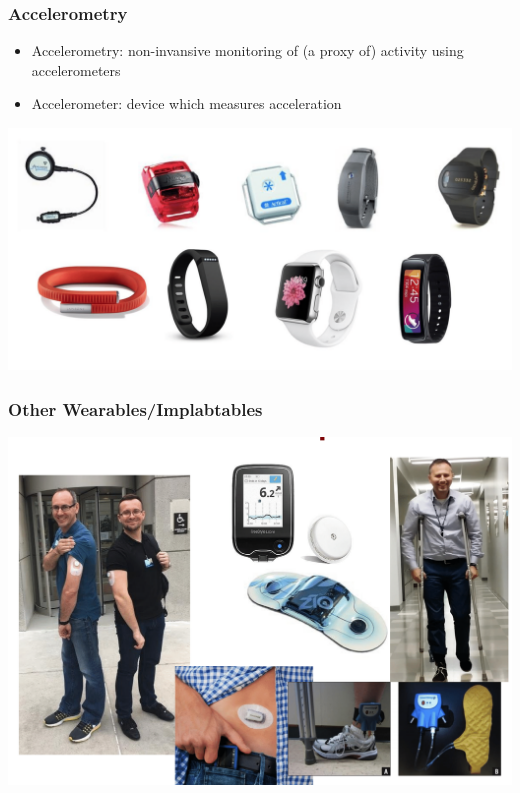 \documentclass[10pt]{beamer}\usepackage[]{graphicx}\usepackage[]{color}
\begin{document}
\begin{frame}
\frametitle{Accelerometry}
\begin{itemize}
\item Accelerometry: non-invansive monitoring of (a proxy of) activity using accelerometers
\item Accelerometer: device which measures acceleration
\end{itemize}
\includegraphics[width=\textwidth]{accelerometers_example}
\end{frame}




\begin{frame}
\frametitle{Other Wearables/Implabtables}
\includegraphics[width=\textwidth]{wearables_example}
\end{frame}
\end{document}
